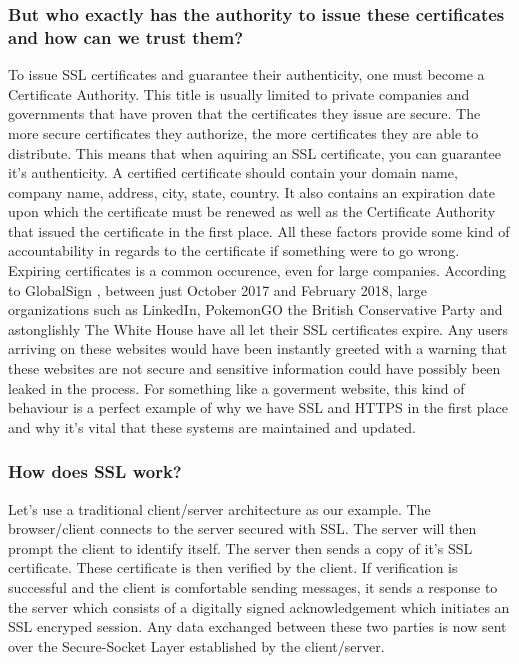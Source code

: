     \subsubsection{But who exactly has the authority to issue these certificates and how can we trust them?}
    To issue SSL certificates and guarantee their authenticity, one must become a Certificate Authority. 
    This title is usually limited to private companies and governments that have proven that the certificates they issue are secure. The more secure certificates they authorize, the more certificates they are able to distribute. 
    This means that when aquiring an SSL certificate, you can guarantee it's authenticity. A certified certificate should contain your domain name, company name, address, city, state, country. It also contains an expiration date upon which the certificate must be renewed as well as the Certificate Authority that issued the certificate in the first place.
    All these factors provide some kind of accountability in regards to the certificate if something were to go wrong. Expiring certificates is a common occurence, even for large companies. According to GlobalSign \cite{GlobalSign}, between just October 2017 and February 2018, large organizations such as LinkedIn, PokemonGO the British Conservative Party and astonglishly The White House 
    have all let their SSL certificates expire. Any users arriving on these websites would have been instantly greeted with a warning that these websites are not secure and sensitive information could have possibly been leaked in the process. For something like a goverment website, this kind of behaviour is a perfect example of why we have SSL and HTTPS in the first place and why it's vital that these systems are maintained and updated.

    \subsubsection{How does SSL work?}
    Let's use a traditional client/server architecture as our example. The browser/client connects to the server secured with SSL. The server will then prompt the client to identify itself.
    The server then sends a copy of it's SSL certificate. These certificate is then verified by the client. \cite{SSLExpired} If verification is successful and the client is comfortable sending messages, it sends a response to the server which consists of a digitally signed acknowledgement which initiates an SSL encryped session.
    Any data exchanged between these two parties is now sent over the Secure-Socket Layer established by the client/server.



